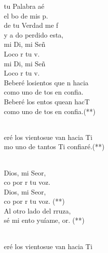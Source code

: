 \documentclass[12pt]{article}
\begin{document}
\begin{multicols*}{2}
\begin{cancion}[Hacia Ti][Ixcís]%
	tu Palabra aé\\
	el bo de mis p.\\
	de tu Verdad me f\\
	y a do perdido esta,\\
	mi Di, mi Señ\\
	Loco  r tu v. \\
	mi Di, mi Señ\\
	Loco  r tu v.\\
	Beberé losientos que n hacia\\
	como uno de tos en  confia.\\
	Beberé los entos quean hacT\\
	como uno de tos en  confia.(**)\\\jump\\
	\begin{chorus}%
	eré los vientosue van hacia Ti\\
	mo uno de tantos Ti confiaré.(**)\\
	\end{chorus}%
	\jump\\
	Dios, mi Seor,\\
	co por r tu voz.\\
	Dios, mi Seor,\\
	co por r tu voz. (**)\\
	Al otro lado del rruza,\\
	sé mi ento yuíame, or. (**) \\\jump\\
	\begin{chorus}%
	eré los vientosue van hacia Ti\\

\end{chorus}
\end{cancion}
\end{multicols*}
\end{document}
